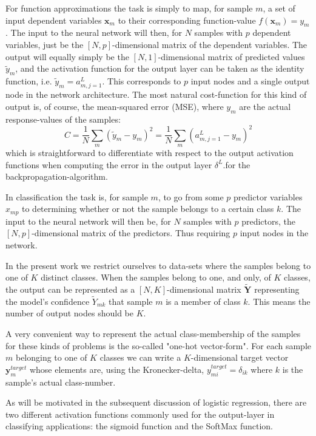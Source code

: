 \documentclass[reprint, english, nofootinbib]{revtex4-2}
\begin{document}
For function approximations the task is simply to map, for sample $m$,  a set of input dependent variables $\mathbf{x}_m$ to their corresponding function-value $f(\mathbf{x}_m) = y_m$. The input to the neural network will then, for $N$ samples with $p$ dependent variables, just be the $[N,p]$-dimensional matrix of the dependent variables. The output will equally simply be the $[N,1]$-dimensional matrix of predicted values $\tilde{y}_m$, and the activation function for the output layer can be taken as the identity function, i.e. $\tilde{y}_m = a^L_{m,j=1}$. This corresponds to $p$ input nodes and a single output node in the network architecture. The most natural cost-function for this kind of output is, of course, the mean-squared error (MSE), where $y_m$ are the actual response-values of the samples:
\begin{equation}
\label{eq:cost_mse}
C = \frac{1}{N} \sum_m (\tilde{y}_m - y_m)^2 = \frac{1}{N} \sum_m (a^L_{m,j=1} - y_m)^2
\end{equation}
which is straightforward to differentiate with respect to the output activation functions when computing the error in the output layer $\delta^L$.for the backpropagation-algorithm.

In classification the task is, for sample $m$, to go from some $p$ predictor variables $x_{mp}$ to determining whether or not the sample belongs to a certain class $k$. The input to the neural network will then be, for $N$ samples with $p$ predictors, the $[N,p]$-dimensional matrix of the predictors. Thus requiring $p$ input nodes in the network.

In the present work we restrict ourselves to data-sets where the samples belong to one of $K$ distinct classes. When the samples belong to one, and only, of $K$ classes, the output can be represented as a $[N,K]$-dimensional matrix $\mathbf{\tilde{Y}}$ representing the model's confidence $\tilde{Y}_{mk}$ that sample $m$ is a member of class $k$. This means the number of output nodes should be $K$.

A very convenient way to represent the actual class-membership of the samples for these kinds of problems is the so-called "one-hot vector-form". For each sample $m$ belonging to one of $K$ classes we can write a $K$-dimensional target vector $\mathbf{y}_m^{target}$ whose elements are, using the Kronecker-delta, $y^{target}_{mi} = \delta_{ik}$ where $k$ is the sample's actual class-number.

As will be motivated in the subsequent discussion of logistic regression, there are two different activation functions commonly used for the output-layer in classifying applications: the sigmoid function and the SoftMax function.
\end{document}
